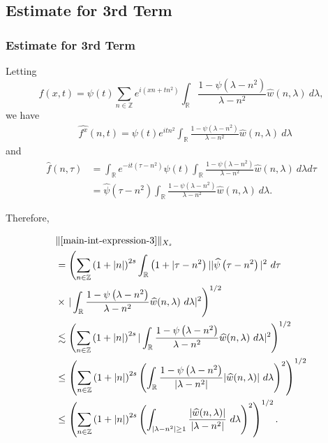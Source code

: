 \documentclass[handout]{beamer}
\numberwithin{equation}{section}
\newcommand{\rr}{\mathbb{R}}
\newcommand{\zz}{\mathbb{Z}}
\newcommand{\wh}{\widehat}
\begin{document}
\subsection{Estimate for 3rd Term}
\begin{frame}
	\frametitle{Estimate for 3rd Term}
Letting $$f(x,t) = \psi(t) \sum_{n \in \zz} e^{i\left( xn + tn^{2} \right)} 
\int_\rr \frac{1 - \psi\left( \lambda - n^{2} \right)}{\lambda - n^{2}} 
\wh{w} \left( n, \lambda \right) \ d \lambda,$$ we have
%
%
\begin{equation*}
	\begin{split}
		& \wh{f^x}(n, t) = \psi(t) e^{itn^{2}} \int_\rr
		\frac{1 - \psi\left( \lambda - n^{2} \right)}{\lambda - n^{2}} 
		\wh{w}(n, \lambda) \ d \lambda
	\end{split}
\end{equation*}
and
\begin{equation*}
	\begin{split}
		 \wh{f}\left( n, \tau \right)
		 & = \int_\rr e^{-it\left( \tau - n^{2} 
		\right)} \psi(t) \int_\rr \frac{1 - \psi\left( 
		\lambda - n^{2} 
		\right)}{\lambda - n^{2}} \wh{w}(n, \lambda) \ d \lambda d \tau
		\\
		& = \wh{\psi}\left( \tau - n^{2} \right) \int_\rr 
		\frac{1 - \psi\left( 
		\lambda - n^{2} 
		\right)}{\lambda - n^{2}} \wh{w}(n, \lambda) \ d \lambda.
	\end{split}
\end{equation*}

Therefore,
\end{frame}
%
%
\begin{frame}
\begin{equation*}
	\begin{split}
		& \| \eqref{main-int-expression-3} \|_{X_s}  
		\\
		& = \left( \sum_{n \in \zz} \left(1 + |n| \right)^{2s} \int_\rr \left( 1 + | \tau - n^{2
		} \right ) | | \wh{\psi}\left( \tau - n^{2 } \right) |^2 \ d \tau 
		\right .
		\\
		& \times \left . |
		\int_\rr \frac{1 - \psi\left( \lambda - n^{2 } \right)}{\lambda -
		n^{2 }} \wh{w}(n, \lambda) \ d \lambda |^2  \right)^{1/2}
		\\
		& \lesssim \left( \sum_{n \in \zz} \left(1 + |n| \right)^{2s} | \int_\rr
		\frac{1 - \psi\left( \lambda - n^{2 } \right)}{\lambda - n^{2 }}
		\wh{w}(n, \lambda) \ d\lambda |^2 \right)^{1/2}
		\\
		& \le \left( \sum_{n \in \zz} \left(1 + |n| \right)^{2s}  \left ( \int_\rr
		\frac{1 - \psi\left( \lambda - n^{2 } \right)}{|\lambda - n^{2 }|}
		|\wh{w}(n, \lambda) | \ d\lambda \right )^2 \right)^{1/2}
		\\
		& \le \left( \sum_{n \in \zz} \left(1 + |n| \right)^{2s}  \left ( \int_{| \lambda - 
		n^{2 } | \ge 1}
		\frac{|\wh{w}(n, \lambda) | }{|\lambda - n^{2 }|}
		\ d\lambda \right )^2 \right)^{1/2}.
	\end{split}
\end{equation*}

\end{frame}
\end{document}

